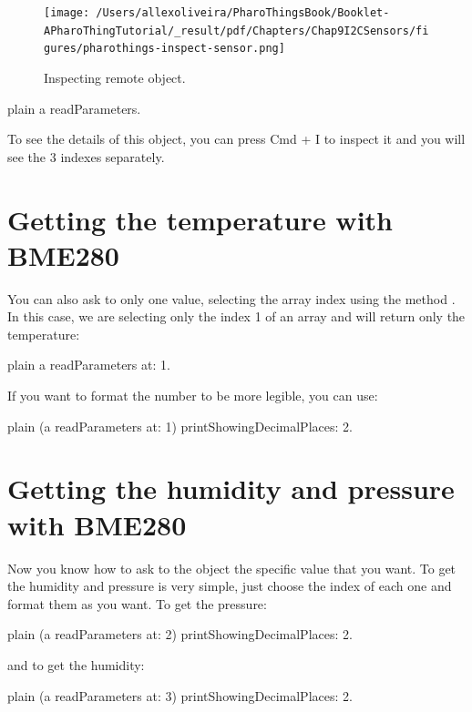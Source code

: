 \documentclass[10pt,twoside,english]{_support/latex/sbabook/sbabook}
\begin{document}
\begin{figure}

\begin{center}
\texttt{[image: /Users/allexoliveira/PharoThingsBook/Booklet-APharoThingTutorial/\_result/pdf/Chapters/Chap9I2CSensors/figures/pharothings-inspect-sensor.png]}\caption{Inspecting remote object.\label{inspectorSensor}}\end{center}
\end{figure}


\begin{displaycode}{plain}
a readParameters.
\end{displaycode}

To see the details of this object, you can press Cmd + I to inspect it and you will see the 3 indexes separately. 
\section{Getting the temperature with BME280}
You can also ask to only one value, selecting the array index using the method . In this case, we are selecting only the index 1 of an array and will return only the temperature:

\begin{displaycode}{plain}
a readParameters at: 1.
\end{displaycode}

If you want to format the number to be more legible, you can use:

\begin{displaycode}{plain}
(a readParameters at: 1) printShowingDecimalPlaces: 2.
\end{displaycode}
\section{Getting the humidity and pressure with BME280}
Now you know how to ask to the object the specific value that you want. To get the humidity and pressure is very simple, just choose the index of each one and format them as you want. To get the pressure:

\begin{displaycode}{plain}
(a readParameters at: 2) printShowingDecimalPlaces: 2.
\end{displaycode}

and to get the humidity:

\begin{displaycode}{plain}
(a readParameters at: 3) printShowingDecimalPlaces: 2.
\end{displaycode}
\end{document}
